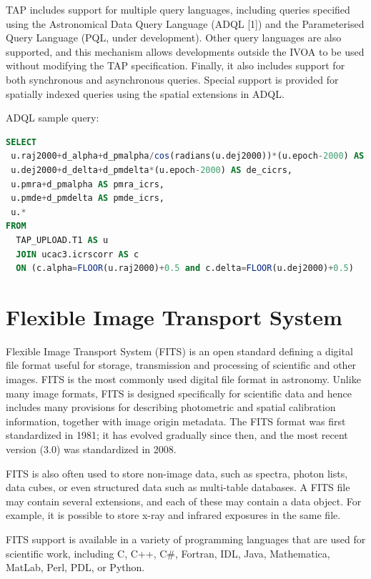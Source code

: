 TAP includes support for multiple query languages, including queries specified using the Astronomical Data Query Language (ADQL [1]) and the Parameterised Query Language (PQL, under development). Other query languages are also supported, and this mechanism allows developments outside the IVOA to be used without modifying the TAP specification. Finally, it also includes support for both synchronous and asynchronous queries. Special support is provided for spatially indexed queries using the spatial extensions in ADQL. \newline

ADQL sample query:
\begin{lstlisting}[language=SQL]
SELECT 
 u.raj2000+d_alpha+d_pmalpha/cos(radians(u.dej2000))*(u.epoch-2000) AS ra_icrs,
 u.dej2000+d_delta+d_pmdelta*(u.epoch-2000) AS de_cicrs,
 u.pmra+d_pmalpha AS pmra_icrs,
 u.pmde+d_pmdelta AS pmde_icrs,
 u.*
FROM
  TAP_UPLOAD.T1 AS u
  JOIN ucac3.icrscorr AS c
  ON (c.alpha=FLOOR(u.raj2000)+0.5 and c.delta=FLOOR(u.dej2000)+0.5)
\end{lstlisting}


\section{Flexible Image Transport System}
 
Flexible Image Transport System (FITS) is an open standard defining a digital file format useful for storage, transmission and processing of scientific and other images. FITS is the most commonly used digital file format in astronomy. Unlike many image formats, FITS is designed specifically for scientific data and hence includes many provisions for describing photometric and spatial calibration information, together with image origin metadata. The FITS format was first standardized in 1981; it has evolved gradually since then, and the most recent version (3.0) was standardized in 2008. \newline
  
FITS is also often used to store non-image data, such as spectra, photon lists, data cubes, or even structured data such as multi-table databases. A FITS file may contain several extensions, and each of these may contain a data object. For example, it is possible to store x-ray and infrared exposures in the same file. \newline
 
FITS support is available in a variety of programming languages that are used for scientific work, including C, C++, C\#, Fortran, IDL, Java, Mathematica, MatLab, Perl, PDL, or Python. \newline
 

